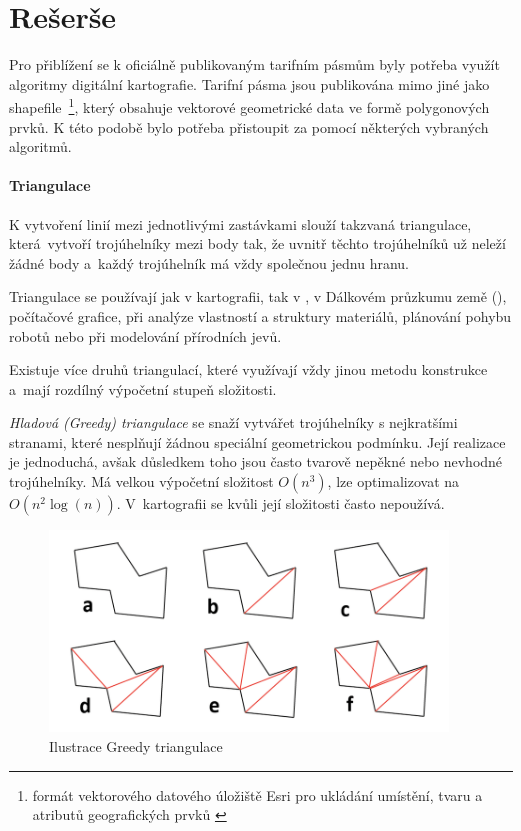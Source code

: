 \chapter{Rešerše}
\label{0-reserse}

Pro přiblížení se k oficiálně publikovaným tarifním pásmům byly
potřeba využít algoritmy digitální kartografie. Tarifní pásma jsou
publikována mimo jiné jako shapefile~\footnote{formát vektorového
  datového úložiště Esri pro ukládání umístění, tvaru a atributů
  geografic\-kých prvků \cite{shapefile}}, který obsahuje vektorové
geometrické data ve formě polygonových prvků. K této podobě bylo
potřeba přistoupit za pomocí některých vybraných algoritmů.

\subsubsection{Triangulace}
\label{triangulace}

K vytvoření linií mezi jednotlivými zastávkami slouží takzvaná triangulace, 
která~vy\-tvoří troj\-úhelníky mezi body tak, že uvnitř těchto trojúhelníků  
už neleží žádné body a~každý trojúhelník má vždy společnou jednu hranu. 

Triangulace se používají jak v kartografii, tak v , v Dálkovém průzkumu země (),
počítačové grafice, při analýze vlastností a struktury materiálů, plánování pohybu robotů
nebo při modelování přírodních jevů. \cite{bayer-delaunay}

Existuje více druhů triangulací, které využívají vždy jinou metodu konstrukce a~mají 
rozdílný výpočetní stupeň složitosti. 

\textit{Hladová (Greedy) triangulace} se snaží vytvářet trojúhelníky s nejkratšími strana\-mi,
které nesplňují žádnou speciální geometrickou podmínku. Její realizace je jedno\-duchá,
avšak důsledkem toho jsou často tvarově nepěkné nebo nevhodné trojúhelníky. Má velkou výpočetní
složitost \(O(n^3)\), lze optimalizovat na \(O(n^2 \log(n))\). V~kartografii se
kvůli její složitosti často nepoužívá. \cite{vanicek}

\begin{figure}[H] \centering
    \includegraphics[width=300pt]{./pictures/triangulace-greedy.png}
    \caption[Ilustrace Greedy triangulace]{Ilustrace Greedy triangulace \cite{triangulace-greedy}}
	\label{fig:triangulace-greedy}              
\end{figure}

